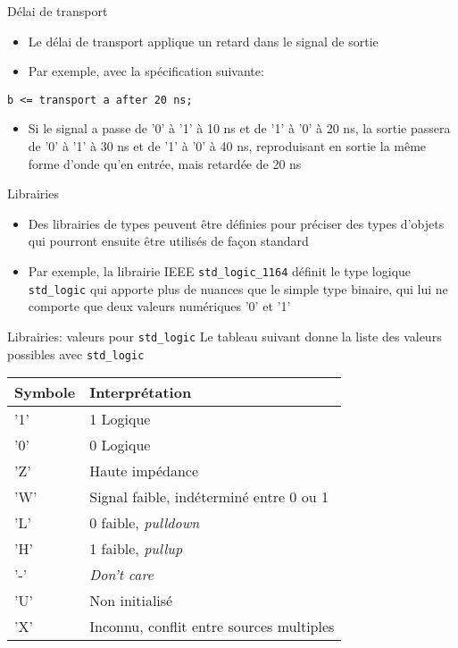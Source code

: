 \documentclass[presentation]{beamer}
\begin{document}
\begin{frame}[label={sec:org9566e43},fragile]{Délai de transport}
 \begin{itemize}
\item Le délai de transport applique un retard dans le signal de sortie
\item Par exemple, avec la spécification suivante:
\end{itemize}


\begin{verbatim}
b <= transport a after 20 ns;
\end{verbatim}

\begin{itemize}
\item Si le signal a passe de '0' à '1' à 10 ns et de '1' à '0' à 20 ns, la sortie passera de '0' à '1' à 30 ns et de '1' à '0' à 40 ns, reproduisant en sortie la même forme d'onde qu'en entrée, mais retardée de 20 ns
\end{itemize}
\end{frame}

\begin{frame}[label={sec:org7fe1dcf},fragile]{Librairies}
 \begin{itemize}
\item Des librairies de types peuvent être définies pour préciser des types d'objets qui pourront ensuite être utilisés de façon standard
\item Par exemple, la librairie IEEE \texttt{std\_logic\_1164} définit le type logique \texttt{std\_logic} qui apporte plus de nuances que le simple type binaire, qui lui ne comporte que deux valeurs numériques '0' et '1'
\end{itemize}
\end{frame}

\begin{frame}[label={sec:orgd9af7d4},fragile]{Librairies: valeurs pour \texttt{std\_logic}}
 Le tableau suivant donne la liste des valeurs possibles avec
\texttt{std\_logic}

\begin{table}[htbp]
\label{tab:org330a7b1}
\centering
\begin{tabular}{ll}
Symbole & Interprétation\\[0pt]
\hline
'1' & 1 Logique\\[0pt]
'0' & 0 Logique\\[0pt]
'Z' & Haute impédance\\[0pt]
'W' & Signal faible, indéterminé entre 0 ou 1\\[0pt]
'L' & 0 faible, \emph{pulldown}\\[0pt]
'H' & 1 faible, \emph{pullup}\\[0pt]
'-' & \emph{Don't care}\\[0pt]
'U' & Non initialisé\\[0pt]
'X' & Inconnu, conflit entre sources multiples\\[0pt]
\end{tabular}
\end{table}
\end{frame}
\end{document}
